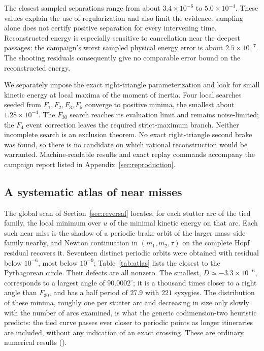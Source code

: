 The closest sampled separations range from about $3.4\times10^{-6}$ to
$5.0\times10^{-4}$. These values explain the use of regularization and
also limit the evidence: sampling alone does not certify positive
separation for every intervening time. Reconstructed energy is especially
sensitive to cancellation near the deepest passages; the campaign's worst
sampled physical energy error is about $2.5\times10^{-7}$. The shooting
residuals consequently give no comparable error bound on the reconstructed
energy.

We separately impose the exact right-triangle parameterization and look
for small kinetic energy at local maxima of the moment of inertia. Four
local searches seeded from $F_1,F_2,F_3,F_5$ converge to positive minima,
the smallest about $1.28\times10^{-4}$. The $F_{30}$ search reaches its
evaluation limit and remains noise-limited; the $F_4$ event correction
leaves the required strict-maximum branch. Neither incomplete search is
an exclusion theorem. No exact right-triangle second brake was found, so
there is no candidate on which rational reconstruction would be warranted.
Machine-readable results and exact replay commands accompany the campaign
report listed in Appendix~\ref{sec:reproduction}.


\subsection{A systematic atlas of near misses}

The global scan of Section~\ref{sec:reversal} locates, for each stutter
arc of the tied family, the local minimum over $u$ of the minimal kinetic
energy on that arc. Each such near miss is the shadow of a periodic brake
orbit of the larger mass--side family nearby, and Newton continuation in
$(m_1,m_2,\tau)$ on the complete Hopf residual recovers it. Seventeen
distinct periodic orbits were obtained with residual below $10^{-6}$, most
below $10^{-9}$; Table~\ref{tab:atlas} lists the closest to the Pythagorean
circle. Their defects are all nonzero. The smallest,
$D\simeq-3.3\times10^{-6}$, corresponds to a largest angle of
$90.0002^\circ$; it is a thousand times closer to a right angle than
$F_{30}$, and has a half period of $27.9$ with $221$ syzygies. The
distribution of these minima, roughly one per stutter arc and decreasing in
size only slowly with the number of arcs examined, is what the generic
codimension-two heuristic predicts: the tied curve passes ever closer to
periodic points as longer itineraries are included, without any indication
of an exact crossing. These are ordinary numerical results
().

